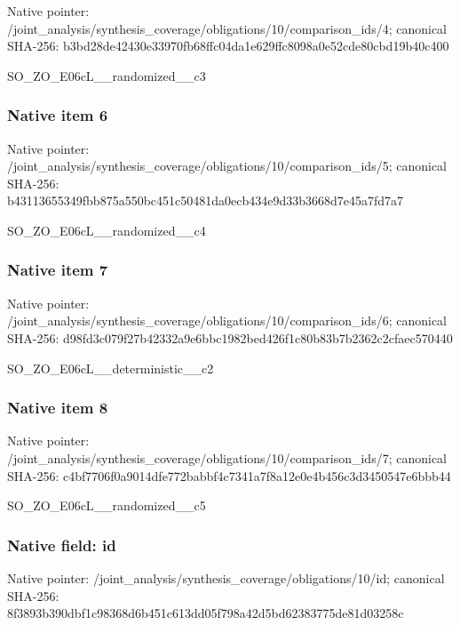 \documentclass[10pt,a4paper]{article}
\begin{document}
Native pointer: /joint\_analysis/synthesi\allowbreak{}s\_coverage/obligations/1\allowbreak{}0/comparison\_ids/4; canonical SHA-256: b3bd28de42430e33970fb68f\allowbreak{}fc04da1e629ffc8098a0e52c\allowbreak{}de80cbd19b40c400


SO\_ZO\_E06cL\_\_randomized\_\_c3


\subsubsection{Native item 6}


Native pointer: /joint\_analysis/synthesi\allowbreak{}s\_coverage/obligations/1\allowbreak{}0/comparison\_ids/5; canonical SHA-256: b43113655349fbb875a550bc\allowbreak{}451c50481da0ecb434e9d33b\allowbreak{}3668d7e45a7fd7a7


SO\_ZO\_E06cL\_\_randomized\_\_c4


\subsubsection{Native item 7}


Native pointer: /joint\_analysis/synthesi\allowbreak{}s\_coverage/obligations/1\allowbreak{}0/comparison\_ids/6; canonical SHA-256: d98fd3c079f27b42332a9e6b\allowbreak{}bc1982bed426f1c80b83b7b2\allowbreak{}362c2cfaec570440


SO\_ZO\_E06cL\_\_deterministic\_\_c2


\subsubsection{Native item 8}


Native pointer: /joint\_analysis/synthesi\allowbreak{}s\_coverage/obligations/1\allowbreak{}0/comparison\_ids/7; canonical SHA-256: c4bf7706f0a9014dfe772bab\allowbreak{}bf4c7341a7f8a12e0e4b456c\allowbreak{}3d3450547e6bbb44


SO\_ZO\_E06cL\_\_randomized\_\_c5


\subsubsection{Native field: id}


Native pointer: /joint\_analysis/synthesi\allowbreak{}s\_coverage/obligations/1\allowbreak{}0/id; canonical SHA-256: 8f3893b390dbf1c98368d6b4\allowbreak{}51c613dd05f798a42d5bd623\allowbreak{}83775de81d03258c
\end{document}
